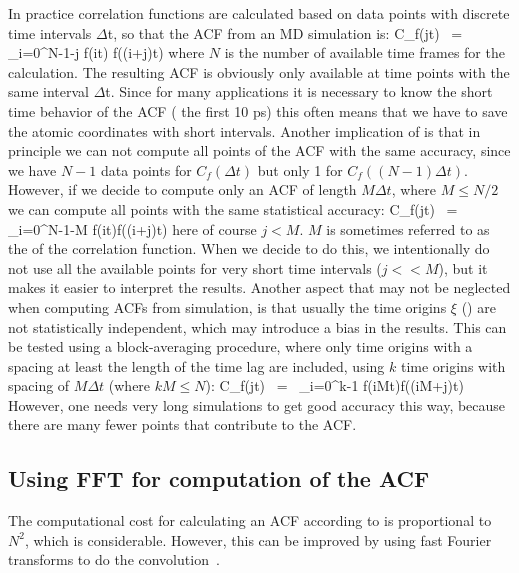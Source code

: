 {In practice correlation functions are calculated based on data points with
discrete time intervals {$\Delta$t}, so that the ACF from an MD simulation is:
\beq
C_f(j\Delta t)  ~=~     \sum_{i=0}^{N-1-j} f(i\Delta t) f((i+j)\Delta t)
\label{eqn:corrmd}
\eeq
where $N$ is the number of available time frames for the calculation.
The resulting ACF is
obviously only available at time points with the same interval {$\Delta$t}.
Since for many applications it is necessary to know  the short time behavior
of the ACF ({\eg} the first 10 ps) this often means that we have to save the
atomic coordinates with short intervals.
Another implication of  is that in principle we can not compute
all points of the ACF with the same accuracy, since we have $N-1$ data points
for $C_f(\Delta t)$ but only 1 for $C_f((N-1)\Delta t)$. However, if we decide to
compute only an ACF of length $M\Delta t$, where $M \leq N/2$ we can compute 
all points with the same statistical accuracy:
\beq
C_f(j\Delta t)  ~=~ \sum_{i=0}^{N-1-M} f(i\Delta t)f((i+j)\Delta t)
\eeq
here of course $j < M$.
$M$ is sometimes referred to as the  of the correlation function. 
When we decide to do this, we intentionally do not use all the available points
for very short time intervals ($j << M$), but it makes it easier to interpret
the results.
Another aspect that may not be neglected when computing
ACFs from simulation, is that usually the time origins $\xi$ ()
are not statistically independent, which may introduce a bias in the results.
This can be tested using a block-averaging procedure, where only time origins
with a spacing at least the length of the time lag are included, {\eg} using 
$k$ time origins with spacing of $M\Delta t$ (where $kM \leq N$):
\beq
C_f(j\Delta t)  ~=~ \sum_{i=0}^{k-1} f(iM\Delta t)f((iM+j)\Delta t)
\eeq
However, one
needs very long simulations to get good accuracy this way, because there are 
many fewer points that contribute to the ACF.

\subsection{Using FFT for computation of the ACF}
The computational cost for calculating an ACF according to 
is proportional to $N^2$, which is considerable. However, this can be improved
by using fast Fourier transforms to do the convolution~\cite{Allen87}.

}

